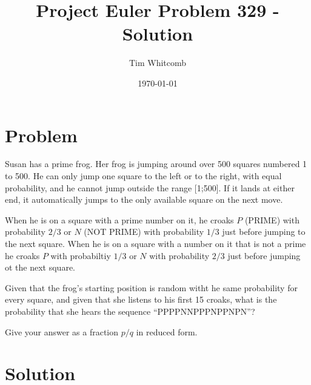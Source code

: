 \documentclass{article}
\title{Project Euler Problem 329 - Solution}
\author{Tim Whitcomb}
\date{\today}
\begin{document}
	\maketitle

\section{Problem}

Susan has a prime frog.  Her frog is jumping around over 500 squares numbered 1 to 500.  He can only jump one square to the left or to the right, with equal probability, and he cannot jump outside the range [1;500].  If it lands at either end, it automatically jumps to the only available square on the next move.

When he is on a square with a prime number on it, he croaks $P$ (PRIME) with probability $2/3$ or $N$ (NOT PRIME) with probability $1/3$ just before jumping to the next square.  When he is on a square with a number on it that is not a prime he croaks $P$ with probabiltiy $1/3$ or $N$ with probability $2/3$ just before jumping ot the next square.

Given that the frog's starting position is random witht he same probability for every square, and given that she listens to his first 15 croaks, what is the probability that she hears the sequence ``PPPPNNPPPNPPNPN''?

Give your answer as a fraction $p/q$ in reduced form.
\section{Solution}
\end{document}
